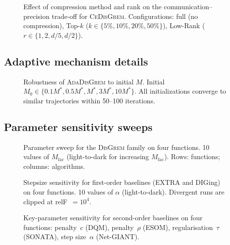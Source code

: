 \documentclass[review,onefignum,onetabnum]{siamart171218}
\begin{document}
\begin{figure}[htbp]
	\centering
	\caption{Effect of compression method and rank on the
		communication--precision trade-off for \textsc{CeDisGrem}.
		Configurations: full (no compression),
		Top-$k$ ($k\in\{5\%,10\%,20\%,50\%\}$),
		Low-Rank ($r\in\{1,2,d/5,d/2\}$).}
	\label{fig:compress}
\end{figure}

\subsection{Adaptive mechanism details}

\begin{figure}[htbp]
	\centering
	\caption{Robustness of \textsc{AdaDisGrem} to initial $M$.
		Initial $M_0\in\{0.1M^*,0.5M^*,M^*,3M^*,10M^*\}$.
		All initializations converge to similar trajectories within
		50--100 iterations.}
	\label{fig:ada_init_m}
\end{figure}

\subsection{Parameter sensitivity sweeps}

\begin{figure}[htbp]
	\centering
	\caption{Parameter sweep for the \textsc{DisGrem} family
		on four functions.
		10 values of $M_{\mathrm{fac}}$ (light-to-dark for increasing
		$M_{\mathrm{fac}}$).
		Rows: functions; columns: algorithms.}
	\label{fig:sweep_disgrem}
\end{figure}

\begin{figure}[htbp]
	\centering
	\caption{Stepsize sensitivity for first-order baselines
		(EXTRA and DIGing) on four functions.
		10 values of $\alpha$ (light-to-dark).
		Divergent runs are clipped at relF~$=10^4$.}
	\label{fig:sweep_first}
\end{figure}

\begin{figure}[htbp]
	\centering
	\caption{Key-parameter sensitivity for second-order baselines
		on four functions: penalty~$c$ (DQM), penalty~$\rho$ (ESOM),
		regularisation~$\tau$ (SONATA), step size~$\alpha$ (Net-GIANT).}
	\label{fig:sweep_second}
\end{figure}
\end{document}
